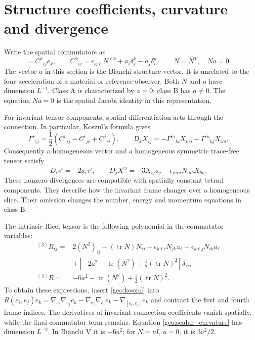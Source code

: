 \section{Structure coefficients, curvature and divergence}

Write the spatial commutators as
\begin{equation}
 [e_i,e_j]=C^k{}_{ij}e_k,\qquad
 C^k{}_{ij}=\epsilon_{ij\ell}N^{\ell k}
       +a_i\delta_j^k-a_j\delta_i^k,
 \qquad N=N^T,\quad Na=0.
 \label{geo:structure}
\end{equation}
The vector $a$ in this section is the Bianchi structure vector. It is unrelated to the four-acceleration of a material or reference observer. Both $N$ and $a$ have dimension $L^{-1}$. Class A is characterized by $a=0$; class B has $a\ne0$. The equation $Na=0$ is the spatial Jacobi identity in this representation.

For invariant tensor components, spatial differentiation acts through the connection. In particular, Koszul's formula gives
\begin{equation}
 \Gamma^r{}_{ij}=\frac12\left(C^r{}_{ij}-C^i{}_{jr}+C^j{}_{ri}\right),
 \qquad D_kX_{ij}=-\Gamma^m{}_{ki}X_{mj}-\Gamma^m{}_{kj}X_{im}.
 \label{geo:koszul}
\end{equation}
Consequently a homogeneous vector and a homogeneous symmetric trace-free tensor satisfy
\begin{equation}
 D_iv^i=-2a_iv^i,\qquad
 D_jX^{ij}=-3X_{ij}a_j-\epsilon_{imn}N_{mb}X_{bn}.
 \label{geo:divergence}
\end{equation}
These nonzero divergences are compatible with spatially constant tetrad components. They describe how the invariant frame changes over a homogeneous slice. Their omission changes the number, energy and momentum equations in class B.

The intrinsic Ricci tensor is the following polynomial in the commutator variables:
\begin{align}
 {}^{(3)}R_{ij}={}&2(N^2)_{ij}-(\operatorname{tr}N)N_{ij}
 -\epsilon_{k\ell i}N_{jk}a_\ell-\epsilon_{k\ell j}N_{ik}a_\ell\nonumber\\
 &+\left[-2a^2-\operatorname{tr}(N^2)
             +\tfrac12(\operatorname{tr}N)^2\right]\delta_{ij},
 \label{geo:ricci}\\
 {}^{(3)}R={}&-6a^2-\operatorname{tr}(N^2)
                         +\tfrac12(\operatorname{tr}N)^2.
 \label{geo:scalar_curvature}
\end{align}
To obtain these expressions, insert \eqref{geo:koszul} into
$R(e_i,e_j)e_k=\nabla_{e_i}\nabla_{e_j}e_k-
\nabla_{e_j}\nabla_{e_i}e_k-\nabla_{[e_i,e_j]}e_k$ and contract the first and fourth frame indices. The derivatives of invariant connection coefficients vanish spatially, while the final commutator term remains. Equation \eqref{geo:scalar_curvature} has dimension $L^{-2}$. In Bianchi V it is $-6a^2$; for $N=\nu I$, $a=0$, it is $3\nu^2/2$.

